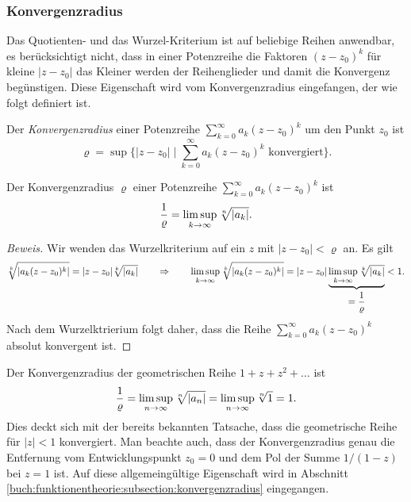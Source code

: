 %
%
\subsubsection{Konvergenzradius}
Das Quotienten- und das Wurzel-Kriterium ist auf beliebige Reihen
anwendbar, es berücksichtigt nicht, dass in einer Potenzreihe
die Faktoren $(z-z_0)^k$ für kleine $|z-z_0|$ das Kleiner werden
der Reihenglieder und damit die Konvergenz begünstigen.
Diese Eigenschaft wird vom Konvergenzradius eingefangen, der wie
folgt definiert ist.

\begin{definition}
\label{buch:polynome:definition:konvergenzradius}
%
Der {\em Konvergenzradius} einer Potenzreihe $\sum_{k=0}^\infty a_k(z-z_0)^k$
um den Punkt $z_0$ ist 
\[
\varrho = \sup \biggl\{ |z-z_0|\;\bigg|\;
\text{$\displaystyle\sum_{k=0}^\infty a_k(z-z_0)^k$ konvergiert}
\biggr\}.
\]
\end{definition}

\begin{satz}
%
\label{buch:polynome:satz:konvergenzradius}
Der Konvergenzradius $\varrho$ einer Potenzreihe
$\sum_{k=0}^\infty a_k(z-z_0)^k$ ist
\begin{equation}
\frac{1}{\varrho}
=
\limsup_{k\to\infty} \root{n}\of{|a_k|}.
\label{buch:polynome:eqn:konvergenzradius}
\end{equation}
\end{satz}

\begin{proof}[Beweis]
Wir wenden das Wurzelkriterium auf ein $z$ mit $|z-z_0|<\varrho$ an.
Es gilt
\[
\root{k}\of{|a_k(z-z_0)^k|}
=
|z-z_0|\root{k}\of{|a_k|}
\qquad
\Rightarrow
\qquad
\limsup_{k\to\infty}\root{k}\of{|a_k(z-z_0)^k|}
=
|z-z_0| \underbrace{\limsup_{k\to\infty}\root{k}\of{|a_k|}}_{\displaystyle=\frac{1}{\varrho}}
<
1.
\]
Nach dem Wurzelktrierium folgt daher, dass die Reihe
$\sum_{k=0}^\infty a_k(z-z_0)^k$ absolut konvergent ist.
\end{proof}

\begin{beispiel}
Der Konvergenzradius der geometrischen Reihe $1+z+z^2+\dots$ ist
\[
\frac{1}{\varrho}
=
\limsup_{n\to\infty} \root{n}\of{|a_n|}
=
\limsup_{n\to\infty} \root{n}\of{1}
=
1.
\]
Dies deckt sich mit der bereits bekannten Tatsache, dass die 
geometrische Reihe für $|z|<1$ konvergiert.
Man beachte auch, dass der Konvergenzradius genau die Entfernung
vom Entwicklungspunkt $z_0=0$ und dem Pol der Summe $1/(1-z)$ bei
$z=1$ ist.
Auf diese allgemeingültige Eigenschaft wird in Abschnitt
\ref{buch:funktionentheorie:subsection:konvergenzradius}
eingegangen.
\end{beispiel}

